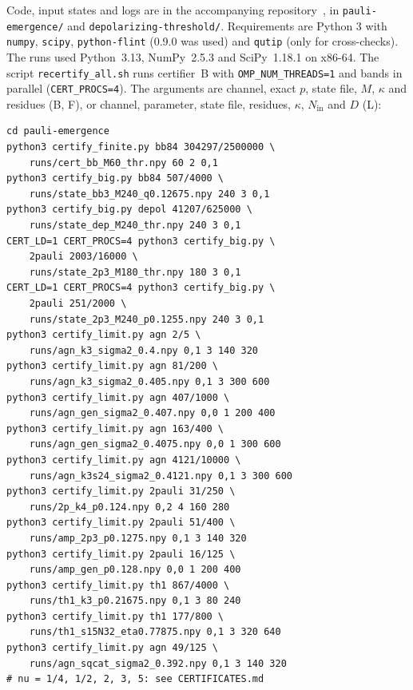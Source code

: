 \documentclass[aps,pra,reprint,superscriptaddress,nofootinbib,longbibliography,floatfix]{revtex4-2}
\theoremstyle{remark}
\begin{document}
Code, input states and logs are in the accompanying repository~\cite{repo}, in
\texttt{pauli-emergence/} and \texttt{depolarizing-threshold/}. Requirements are Python 3
with \texttt{numpy}, \texttt{scipy}, \texttt{python-flint} (0.9.0 was used) and \texttt{qutip} (only for
cross-checks). The runs used Python~3.13, NumPy~2.5.3 and SciPy~1.18.1 on x86-64. The script
\texttt{recertify\_all.sh} runs certifier~B with \texttt{OMP\_NUM\_THREADS=1} and bands in parallel
(\texttt{CERT\_PROCS=4}). The arguments are channel,
exact $p$, state file, $M$, $\kappa$ and residues (B, F), or channel, parameter, state file, residues,
$\kappa$, $N_{\mathrm{in}}$ and $D$ (L):
\par\medskip\noindent\begin{minipage}{\columnwidth}
\small
\begin{verbatim}
cd pauli-emergence
python3 certify_finite.py bb84 304297/2500000 \
    runs/cert_bb_M60_thr.npy 60 2 0,1
python3 certify_big.py bb84 507/4000 \
    runs/state_bb3_M240_q0.12675.npy 240 3 0,1
python3 certify_big.py depol 41207/625000 \
    runs/state_dep_M240_thr.npy 240 3 0,1
CERT_LD=1 CERT_PROCS=4 python3 certify_big.py \
    2pauli 2003/16000 \
    runs/state_2p3_M180_thr.npy 180 3 0,1
CERT_LD=1 CERT_PROCS=4 python3 certify_big.py \
    2pauli 251/2000 \
    runs/state_2p3_M240_p0.1255.npy 240 3 0,1
python3 certify_limit.py agn 2/5 \
    runs/agn_k3_sigma2_0.4.npy 0,1 3 140 320
python3 certify_limit.py agn 81/200 \
    runs/agn_k3_sigma2_0.405.npy 0,1 3 300 600
python3 certify_limit.py agn 407/1000 \
    runs/agn_gen_sigma2_0.407.npy 0,0 1 200 400
python3 certify_limit.py agn 163/400 \
    runs/agn_gen_sigma2_0.4075.npy 0,0 1 300 600
python3 certify_limit.py agn 4121/10000 \
    runs/agn_k3s24_sigma2_0.4121.npy 0,1 3 300 600
python3 certify_limit.py 2pauli 31/250 \
    runs/2p_k4_p0.124.npy 0,2 4 160 280
python3 certify_limit.py 2pauli 51/400 \
    runs/amp_2p3_p0.1275.npy 0,1 3 140 320
python3 certify_limit.py 2pauli 16/125 \
    runs/amp_gen_p0.128.npy 0,0 1 200 400
python3 certify_limit.py th1 867/4000 \
    runs/th1_k3_p0.21675.npy 0,1 3 80 240
python3 certify_limit.py th1 177/800 \
    runs/th1_s15N32_eta0.77875.npy 0,1 3 320 640
python3 certify_limit.py agn 49/125 \
    runs/agn_sqcat_sigma2_0.392.npy 0,1 3 140 320
# nu = 1/4, 1/2, 2, 3, 5: see CERTIFICATES.md
\end{verbatim}
\end{minipage}
\par\medskip
\end{document}
